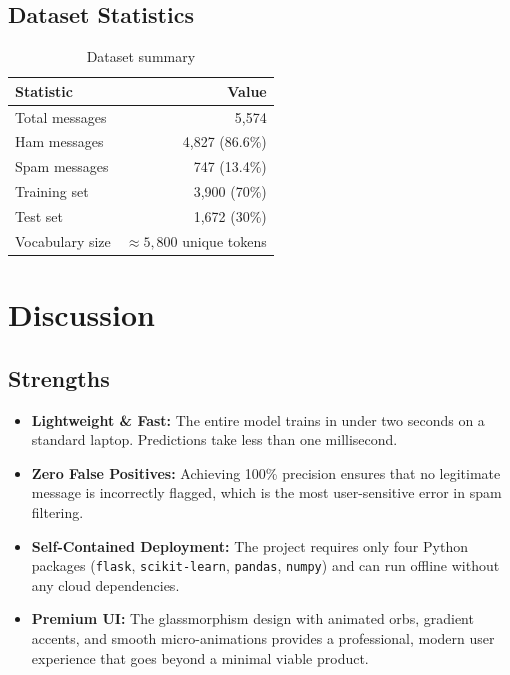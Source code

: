 \documentclass[paper=a4, fontsize=11pt]{scrartcl}
\numberwithin{equation}{section}
\numberwithin{figure}{section}
\numberwithin{table}{section}
\begin{document}
\subsection{Dataset Statistics}

\begin{table}[h]
\centering
\caption{Dataset summary}
\label{tab:dataset}
\begin{tabular}{@{} l r @{}}
\toprule
\textbf{Statistic} & \textbf{Value} \\
\midrule
Total messages   & 5,574 \\
Ham messages     & 4,827 (86.6\%) \\
Spam messages    & 747 (13.4\%) \\
Training set     & 3,900 (70\%) \\
Test set         & 1,672 (30\%) \\  %
Vocabulary size  & $\approx 5,800$ unique tokens \\
\bottomrule
\end{tabular}
\end{table}

\newpage

\section{Discussion}

\subsection{Strengths}
\begin{itemize}
    \item \textbf{Lightweight \& Fast:} The entire model trains in under two seconds on a standard laptop.  Predictions take less than one millisecond.
    \item \textbf{Zero False Positives:} Achieving 100\% precision ensures that no legitimate message is incorrectly flagged, which is the most user-sensitive error in spam filtering.
    \item \textbf{Self-Contained Deployment:} The project requires only four Python packages (\texttt{flask}, \texttt{scikit-learn}, \texttt{pandas}, \texttt{numpy}) and can run offline without any cloud dependencies.
    \item \textbf{Premium UI:} The glassmorphism design with animated orbs, gradient accents, and smooth micro-animations provides a professional, modern user experience that goes beyond a minimal viable product.
\end{itemize}
\end{document}
